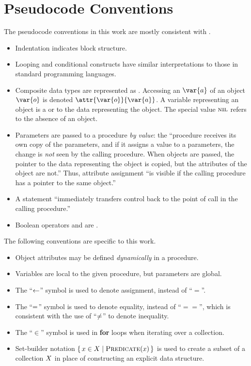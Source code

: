 \chapter{Pseudocode Conventions}\label{ch:pseudocode-conventions}

\newcommand{\vSomeObject}{\var{o}}
\newcommand{\vSomeAttribute}{\var{a}}
\newcommand{\aSomeObjectAttribute}{\attr{\vSomeObject}{\vSomeAttribute}}

The pseudocode conventions in this work are mostly consistent with \citet{Cormen2022}.
%
\begin{itemize}
    \item Indentation indicates block structure.
    \item Looping and conditional constructs have similar interpretations to those in standard programming languages.
    \item Composite data types are represented as . Accessing an  $\vSomeAttribute$ of an object $\vSomeObject$ is denoted
    $\aSomeObjectAttribute$. A variable representing an object is a  or  to the data representing the object. The special value
    $\textsc{nil}$ refers to the absence of an object.
    \item Parameters are passed to a procedure \emph{by value}: the ``procedure receives its own copy of the parameters, and if it assigns a value to a parameters, the change is \emph{not} seen by the calling procedure. When objects are passed, the pointer to the data representing the object is copied, but the attributes of the object are not.'' Thus, attribute assignment ``is visible if the calling procedure has a pointer to the same object.''
    \item A {\Return} statement ``immediately transfers control back to the point of call in the calling procedure.''
    \item Boolean operators {\AND} and {\OR} are .
\end{itemize}
%
The following conventions are specific to this work.
%
\begin{itemize}
    \item Object attributes may be defined \emph{dynamically} in a procedure.
    \item Variables are local to the given procedure, but parameters are global.
    \item The ``$\leftarrow$'' symbol is used to denote assignment, instead of ``$=$''.
    \item The ``$=$'' symbol is used to denote equality, instead of ``$==$'', which is consistent with the use of ``$\neq$'' to denote inequality.
    \item The ``$\in$'' symbol is used in \textbf{for} loops when iterating over a collection.
    \item Set-builder notation $\setBuilder{\vSomeElement \in \vSomeSet}{\cPredicate[\vSomeElement]}$ is used to create a subset of a collection $X$ in place of constructing an explicit data structure.
\end{itemize}